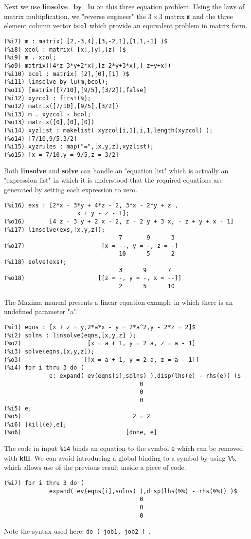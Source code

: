 \documentclass[12pt]{article}
\begin{document}
Next we use \textbf{linsolve\_by\_lu} on this three equation problem.
Using the laws of matrix multiplication, we "reverse engineer" the $3 \times 3$ 
  matrix \verb|m| and the three element column vector \verb|bcol| which provide
  an equivalent problem in matrix form.
\small
\begin{verbatim}
(%i7) m : matrix( [2,-3,4],[3,-2,1],[1,1,-1] )$
(%i8) xcol : matrix( [x],[y],[z] )$
(%i9) m . xcol;
(%o9) matrix([4*z-3*y+2*x],[z-2*y+3*x],[-z+y+x])
(%i10) bcol : matrix( [2],[0],[1] )$
(%i11) linsolve_by_lu(m,bcol);
(%o11) [matrix([7/10],[9/5],[3/2]),false]
(%i12) xyzcol : first(%);
(%o12) matrix([7/10],[9/5],[3/2])
(%i13) m . xyzcol - bcol;
(%o13) matrix([0],[0],[0])
(%i14) xyzlist : makelist( xyzcol[i,1],i,1,length(xyzcol) );
(%o14) [7/10,9/5,3/2]
(%i15) xyzrules : map("=",[x,y,z],xyzlist);
(%o15) [x = 7/10,y = 9/5,z = 3/2]
\end{verbatim}
\normalsize

\smallskip

Both \textbf{linsolve} and \textbf{solve} can handle an "equation list" which
  is actually an "expression list" in which it is understood that the required
  equations are generated by setting each expression to zero.
\small
\begin{verbatim}
(%i16) exs : [2*x - 3*y + 4*z - 2, 3*x - 2*y + z ,
                     x + y - z - 1];
(%o16)       [4 z - 3 y + 2 x - 2, z - 2 y + 3 x, - z + y + x - 1]
(%i17) linsolve(exs,[x,y,z]);
                                 7       9      3
(%o17)                      [x = --, y = -, z = -]
                                 10      5      2
(%i18) solve(exs);
                                 3      9      7
(%o18)                     [[z = -, y = -, x = --]]
                                 2      5      10
\end{verbatim}
\normalsize
The Maxima manual presents a linear equation example in which there is
  an undefined parameter "a".
\small
\begin{verbatim}
(%i1) eqns : [x + z = y,2*a*x - y = 2*a^2,y - 2*z = 2]$
(%i2) solns : linsolve(eqns,[x,y,z] );
(%o2)                   [x = a + 1, y = 2 a, z = a - 1]
(%i3) solve(eqns,[x,y,z]);
(%o3)                  [[x = a + 1, y = 2 a, z = a - 1]]
(%i4) for i thru 3 do (
             e: expand( ev(eqns[i],solns) ),disp(lhs(e) - rhs(e)) )$
                                       0
                                       0
                                       0
(%i5) e;
(%o5)                                2 = 2
(%i6) [kill(e),e];
(%o6)                              [done, e]
\end{verbatim}
\normalsize
The code in input \verb|%i4| binds an equation to the symbol \verb|e|
   which can be removed with \textbf{kill}.
\newpage
We can avoid introducing a global binding to a symbol by using \verb|%%|,
  which allows use of the previous result inside a piece of code.
\small
\begin{verbatim}
(%i7) for i thru 3 do (
             expand( ev(eqns[i],solns) ),disp(lhs(%%) - rhs(%%)) )$
                                       0
                                       0
                                       0
\end{verbatim}
\normalsize
Note the syntax used here: \verb|do ( job1, job2 ) |.
\end{document}
